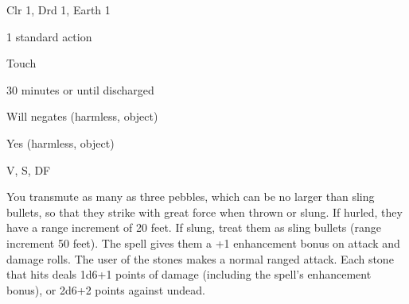 
\begin{description*}
\item[Level:] Clr 1, Drd 1, Earth 1
\item[Casting Time:] 1 standard action
\item[Range:] Touch
\item[Duration:] 30 minutes or until discharged
\item[Saving Throw:] Will negates (harmless, object)
\item[Spell Resistance:] Yes (harmless, object)
\item[Components:] V, S, DF
\end{description*}

You transmute as many as three pebbles, which can be no larger than sling bullets,
so that they strike with great force when thrown or slung. If hurled, they have
a range increment of 20 feet. If slung, treat them as sling bullets (range increment
50 feet). The spell gives them a +1 enhancement bonus on attack and damage rolls.
The user of the stones makes a normal ranged attack. Each stone that hits
deals 1d6+1 points of damage (including the spell's enhancement bonus), or 2d6+2
points against undead.